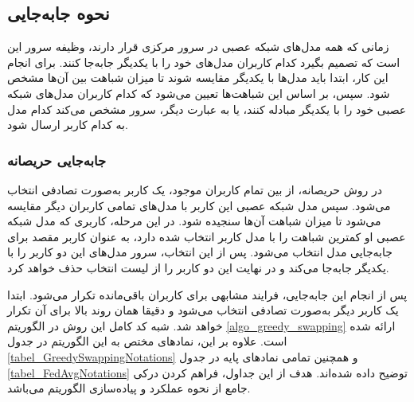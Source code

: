 \subsection{نحوه جابه‌جایی}
زمانی که همه مدل‌های شبکه عصبی در سرور مرکزی قرار دارند، وظیفه سرور این است که تصمیم بگیرد کدام کاربران مدل‌های خود را با یکدیگر جابه‌جا کنند. برای انجام این کار، ابتدا باید مدل‌ها با یکدیگر مقایسه شوند تا میزان شباهت بین آن‌ها مشخص شود. سپس، بر اساس این شباهت‌ها تعیین می‌شود که کدام کاربران مدل‌های شبکه عصبی خود را با یکدیگر مبادله کنند، یا به عبارت دیگر، سرور مشخص می‌کند کدام مدل به کدام کاربر ارسال شود.

\subsubsection{جابه‌جایی حریصانه}

در روش حریصانه، از بین تمام کاربران موجود، یک کاربر به‌صورت تصادفی انتخاب می‌شود. سپس مدل شبکه عصبی این کاربر با مدل‌های تمامی کاربران دیگر مقایسه می‌شود تا میزان شباهت آن‌ها سنجیده شود. در این مرحله، کاربری که مدل شبکه عصبی او کمترین شباهت را با مدل کاربر انتخاب‌ شده دارد، به عنوان کاربر مقصد برای جابه‌جایی مدل انتخاب می‌شود. پس از این انتخاب، سرور مدل‌های این دو کاربر را با یکدیگر جابه‌جا می‌کند و در نهایت این دو کاربر را از لیست انتخاب حذف خواهد کرد.

پس از انجام این جابه‌جایی، فرایند مشابهی برای کاربران باقی‌مانده تکرار می‌شود. ابتدا یک کاربر دیگر به‌صورت تصادفی انتخاب می‌شود و دقیقا همان روند بالا برای آن تکرار خواهد شد.
شبه کد کامل این روش در الگوریتم
\ref{algo_greedy_swapping}
ارائه شده است. علاوه بر این، نمادهای مختص به این الگوریتم در جدول
\ref{tabel_GreedySwappingNotations}
و همچنین تمامی نمادهای پایه در جدول
\ref{tabel_FedAvgNotations}
توضیح داده شده‌اند.
هدف از این جداول، فراهم کردن درکی جامع از نحوه عملکرد و پیاده‌سازی الگوریتم می‌باشد.


